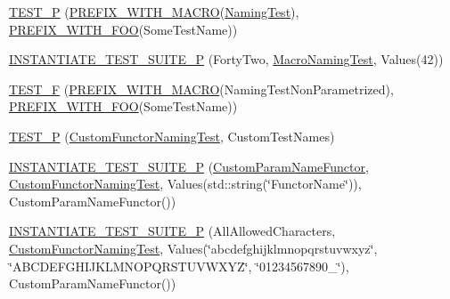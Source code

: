 \begin{DoxyCompactItemize}
\item 
\mbox{\hyperlink{googletest-master_2googletest_2test_2googletest-param-test-test_8cc_a268b3f484920a6a3c08d911a47f07509}{T\+E\+S\+T\+\_\+P}} (\mbox{\hyperlink{_obj__test_2lib_2googletest-release-1_88_81_2googletest_2test_2googletest-param-test-test_8cc_aeb9b224f65fb5b0b8f2323a6903d6a68}{P\+R\+E\+F\+I\+X\+\_\+\+W\+I\+T\+H\+\_\+\+M\+A\+C\+RO}}(\mbox{\hyperlink{class_naming_test}{Naming\+Test}}), \mbox{\hyperlink{_obj__test_2lib_2googletest-release-1_88_81_2googletest_2test_2googletest-param-test-test_8cc_a6414de581a925e7399b27c14e38f8a67}{P\+R\+E\+F\+I\+X\+\_\+\+W\+I\+T\+H\+\_\+\+F\+OO}}(Some\+Test\+Name))
\item 
\mbox{\hyperlink{googletest-master_2googletest_2test_2googletest-param-test-test_8cc_a193f1b24b3c213b2636a14ed661813a9}{I\+N\+S\+T\+A\+N\+T\+I\+A\+T\+E\+\_\+\+T\+E\+S\+T\+\_\+\+S\+U\+I\+T\+E\+\_\+P}} (Forty\+Two, \mbox{\hyperlink{class_macro_naming_test}{Macro\+Naming\+Test}}, Values(42))
\item 
\mbox{\hyperlink{googletest-master_2googletest_2test_2googletest-param-test-test_8cc_a025432fa6a1d1a07929f6897f2dfdaea}{T\+E\+S\+T\+\_\+F}} (\mbox{\hyperlink{_obj__test_2lib_2googletest-release-1_88_81_2googletest_2test_2googletest-param-test-test_8cc_aeb9b224f65fb5b0b8f2323a6903d6a68}{P\+R\+E\+F\+I\+X\+\_\+\+W\+I\+T\+H\+\_\+\+M\+A\+C\+RO}}(Naming\+Test\+Non\+Parametrized), \mbox{\hyperlink{_obj__test_2lib_2googletest-release-1_88_81_2googletest_2test_2googletest-param-test-test_8cc_a6414de581a925e7399b27c14e38f8a67}{P\+R\+E\+F\+I\+X\+\_\+\+W\+I\+T\+H\+\_\+\+F\+OO}}(Some\+Test\+Name))
\item 
\mbox{\hyperlink{googletest-master_2googletest_2test_2googletest-param-test-test_8cc_a64b9799ff848fbf906c2e5c93a66434a}{T\+E\+S\+T\+\_\+P}} (\mbox{\hyperlink{class_custom_functor_naming_test}{Custom\+Functor\+Naming\+Test}}, Custom\+Test\+Names)
\item 
\mbox{\hyperlink{googletest-master_2googletest_2test_2googletest-param-test-test_8cc_a3b409037f9d18b063f5fd6c4dacc347d}{I\+N\+S\+T\+A\+N\+T\+I\+A\+T\+E\+\_\+\+T\+E\+S\+T\+\_\+\+S\+U\+I\+T\+E\+\_\+P}} (\mbox{\hyperlink{struct_custom_param_name_functor}{Custom\+Param\+Name\+Functor}}, \mbox{\hyperlink{class_custom_functor_naming_test}{Custom\+Functor\+Naming\+Test}}, Values(std\+::string(\char`\"{}Functor\+Name\char`\"{})), Custom\+Param\+Name\+Functor())
\item 
\mbox{\hyperlink{googletest-master_2googletest_2test_2googletest-param-test-test_8cc_a13b1886af30ed49d3501dc5cdc2ea195}{I\+N\+S\+T\+A\+N\+T\+I\+A\+T\+E\+\_\+\+T\+E\+S\+T\+\_\+\+S\+U\+I\+T\+E\+\_\+P}} (All\+Allowed\+Characters, \mbox{\hyperlink{class_custom_functor_naming_test}{Custom\+Functor\+Naming\+Test}}, Values(\char`\"{}abcdefghijklmnopqrstuvwxyz\char`\"{}, \char`\"{}A\+B\+C\+D\+E\+F\+G\+H\+I\+J\+K\+L\+M\+N\+O\+P\+Q\+R\+S\+T\+U\+V\+W\+X\+YZ\char`\"{}, \char`\"{}01234567890\+\_\+\char`\"{}), Custom\+Param\+Name\+Functor())

\end{DoxyCompactItemize}
